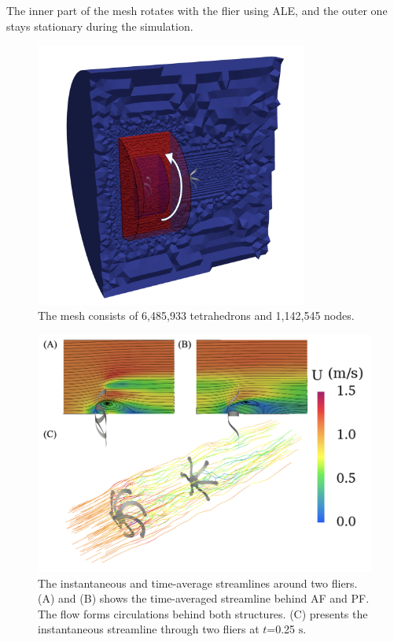 \documentclass[preprint,12pt,sort&compress]{elsarticle}
\theoremstyle{definition}%
\begin{document}
The inner part of the mesh rotates with the flier using ALE, and the outer one stays stationary during the simulation.\\
\begin{figure}[!htbp]
    \centering
    \includegraphics[angle=0,width=0.8\textwidth]{fig/flier-mesh.png}
    \caption{The mesh consists of 6,485,933 tetrahedrons and 1,142,545 nodes.}
    \label{fig:flier-mesh}
\end{figure}
\begin{figure}[!htbp]
    \centering
    \includegraphics[angle=0,width=1.0\textwidth]{fig/flier-streamlines.png}
    \caption{The instantaneous and time-average streamlines around two fliers. (A) and (B) shows the time-averaged 
    streamline behind AF and PF. The flow forms circulations behind both structures. (C) presents the instantaneous 
    streamline through two fliers at $t$=0.25 $\mathrm{s}$.}
    \label{fig:flier-streamline}
\end{figure}
\end{document}

